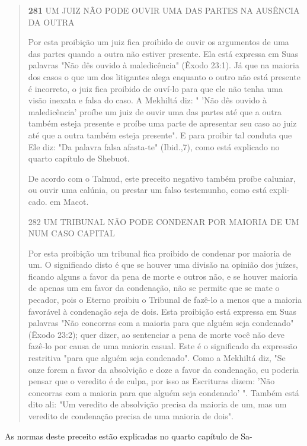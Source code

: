 \begin{quote}
\textbf{281} UM JUIZ NÃO PODE OUVIR UMA DAS PARTES NA AUSÊNCIA DA OUTRA

Por esta proibição um juiz fica proibido de ouvir os argumentos de uma
das partes quando a outra não estiver presente. Ela está expressa em
Suas palavras "Não dês ouvido à maledicência" (Êxodo 23:1). Já que na
maioria dos casos o que um dos litigantes alega enquanto o outro não
está presente é incor­reto, o juiz fica proibido de ouví-lo para que ele
não tenha uma visão inexata e falsa do caso. A Mekhiltá diz: " 'Não dês
ouvido à maledicência' proíbe um juiz de ouvir uma das partes até que a
outra também esteja presente e proíbe uma parte de apresentar seu caso
ao juiz até que a outra também esteja presen­te". E para proibir tal
conduta que Ele diz: "Da palavra falsa afasta-te" (Ibid.,7), como está
explicado no quarto capítulo de Shebuot.

De acordo com o Talmud, este preceito negativo também proíbe ca­luniar,
ou ouvir uma calúnia, ou prestar um falso testemunho, como está
expli­cado. em Macot.

282 UM TRIBUNAL NÃO PODE CONDENAR POR MAIORIA DE UM NUM CASO CAPITAL

Por esta proibição um tribunal fica proibido de condenar por maio­ria de
um. O significado disto é que se houver uma divisão na opinião dos
juízes, ficando alguns a favor da pena de morte e outros não, e se
houver maioria de apenas um em favor da condenação, não se permite que
se mate o pecador, pois o Eterno proibiu o Tribunal de fazê-lo a menos
que a maioria favorável à conde­nação seja de dois. Esta proibição está
expressa em Suas palavras "Não concor­ras com a maioria para que alguém
seja condenado" (Êxodo 23:2); quer dizer, ao sentenciar a pena de morte
você não deve fazê-lo por causa de uma maioria casual. Este é o
significado da expressão restritiva "para que alguém seja conde­nado".
Como a Mekhiltá diz, "Se onze forem a favor da absolvição e doze a
fa­vor da condenação, eu poderia pensar que o veredito é de culpa, por
isso as Escrituras dizem: 'Não concorras com a maioria para que alguém
seja condena­do' ". Também está dito ali: "Um veredito de absolvição
precisa da maioria de um, mas um veredito de condenação precisa de uma
maioria de dois".
\end{quote}

As normas deste preceito estão explicadas no quarto capítulo de Sa-

